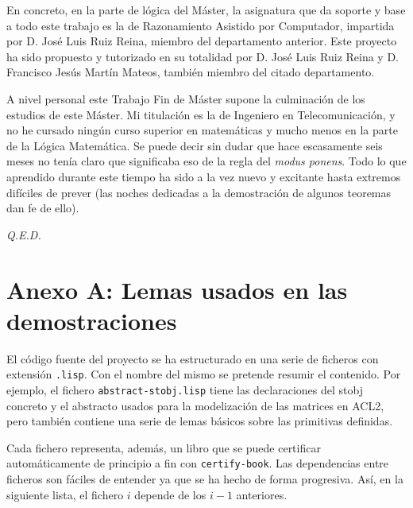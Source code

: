 \documentclass[a4paper,10pt]{article}
\begin{document}
\par \vspace{10pt}

En concreto, en la parte de lógica del Máster, la asignatura que da soporte y base a todo este trabajo es la de Razonamiento Asistido por Computador, impartida por D. José Luis Ruiz Reina, miembro del departamento anterior. Este proyecto ha sido propuesto y tutorizado en su totalidad por D. José Luis Ruiz Reina y D. Francisco Jesús Martín Mateos, también miembro del citado departamento.

\par \vspace{10pt}

A nivel personal este Trabajo Fin de Máster supone la culminación de los estudios de este Máster. Mi titulación es la de Ingeniero en Telecomunicación, y no he cursado ningún curso superior en matemáticas y mucho menos en la parte de la Lógica Matemática. Se puede decir sin dudar que hace escasamente seis meses no tenía claro que significaba eso de la regla del \emph{modus ponens}. Todo lo que aprendido durante este tiempo ha sido a la vez nuevo y excitante hasta extremos difíciles de prever (las noches dedicadas a la demostración de algunos teoremas dan fe de ello). 

\par \vspace{10pt}

\emph{Q.E.D.}

\newpage
\vspace{24pt}
\section{Anexo A: Lemas usados en las demostraciones}

El código fuente del proyecto se ha estructurado en una serie de ficheros con extensión \texttt{.lisp}. Con el nombre del mismo se pretende resumir el contenido. Por ejemplo, el fichero \texttt{abstract-stobj.lisp} tiene las declaraciones del stobj concreto y el abstracto usados para la modelización de las matrices en ACL2, pero también contiene una serie de lemas básicos sobre las primitivas definidas.

\par \vspace{10pt}

Cada fichero representa, además, un libro que se puede certificar automáticamente de principio a fin con \texttt{certify-book}. Las dependencias entre ficheros son fáciles de entender ya que se ha hecho de forma progresiva. Así, en la siguiente lista, el fichero $i$ depende de los $i-1$ anteriores.
\end{document}
